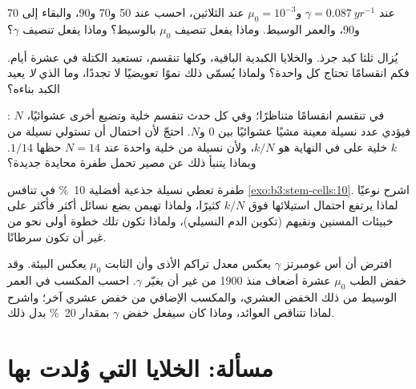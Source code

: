 \begin{exercise}[$\star\star$]\label{exo:b3:stem-cells:8}
عند $\gamma = \qty{0.087}{yr^{-1}}$ و$\mu_{0} = 10^{-3}$ عند
الثلاثين، احسب  عند 50 و70 و90، والبقاء إلى 70
و90، والعمر الوسيط. وماذا يفعل تنصيف $\mu_{0}$ بالوسيط؟ وماذا
يفعل تنصيف $\gamma$؟
\end{exercise}

\begin{exercise}[$\star\star$]\label{exo:b3:stem-cells:9}
يُزال ثلثا كبد جرذ. والخلايا الكبدية الباقية، وكلها تنقسم،
تستعيد الكتلة في عشرة أيام. فكم انقسامًا تحتاج كل واحدة؟
ولماذا يُسمّى ذلك نموًا تعويضيًا لا تجددًا، وما الذي
\emph{لا} يعيد الكبد بناءه؟
\end{exercise}

\begin{exercise}[$\star\star\star$]\label{exo:b3:stem-cells:10}
: $N$  في  تنقسم انقسامًا
متناظرًا؛ وفي كل حدث تنقسم خلية وتضيع أخرى عشوائيًا، فيؤدي
عدد نسيلة معينة مشيًا عشوائيًا بين $0$ و$N$. احتجّ لأن احتمال
أن تستولي نسيلة من $k$ خلية على  في النهاية هو
$k/N$، ولأن نسيلة من خلية واحدة عند $N = 14$ حظها $1/14$.
وبماذا يتنبأ ذلك عن مصير  تحمل طفرة محايدة جديدة؟
\end{exercise}

\begin{exercise}[$\star\star\star$]\label{exo:b3:stem-cells:11}
طفرة تعطي نسيلة جذعية أفضلية \qty{10}{\%} في تنافس
\cref{exo:b3:stem-cells:10}. اشرح نوعيًا لماذا يرتفع احتمال
استيلائها فوق $k/N$ كثيرًا، ولماذا تهيمن بضع نسائل أكثر
فأكثر على خبيئات المسنين ونقيهم (تكوين الدم النسيلي)، ولماذا
تكون تلك خطوة أولى نحو  من غير أن تكون سرطانًا.
\end{exercise}

\begin{exercise}[$\star\star\star$]\label{exo:b3:stem-cells:12}
افترض أن أس غومبرتز $\gamma$ يعكس معدل تراكم الأذى وأن
الثابت $\mu_{0}$ يعكس البيئة. وقد خفض الطب $\mu_{0}$ عشرة
أضعاف منذ 1900 من غير أن يغيّر $\gamma$. احسب المكسب في العمر
الوسيط من ذلك الخفض العشري، والمكسب الإضافي من خفض عشري آخر؛
واشرح لماذا تتناقص العوائد، وماذا كان سيفعل خفض $\gamma$
بمقدار \qty{20}{\%} بدل ذلك.
\end{exercise}

\section{مسألة: الخلايا التي وُلدت بها}

